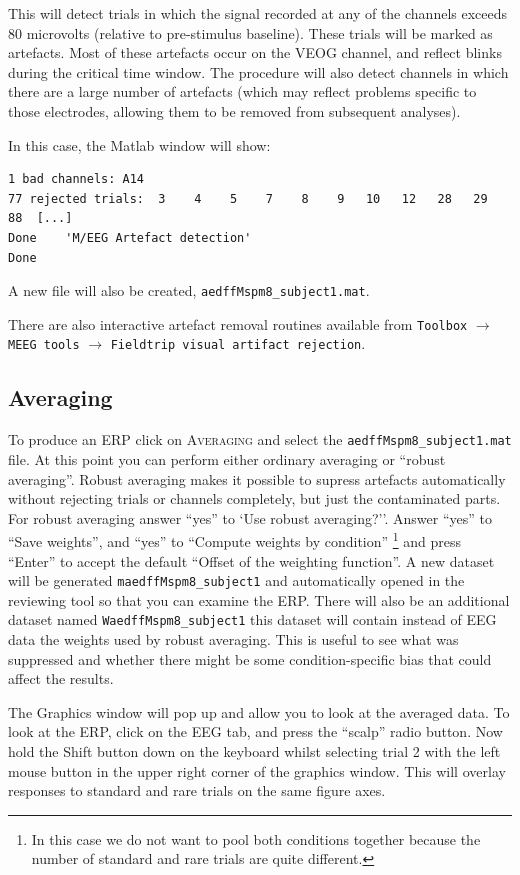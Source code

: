 This will detect trials in which the signal recorded at any of the channels exceeds 80 microvolts (relative to pre-stimulus baseline). These trials will be marked as artefacts. Most of these artefacts occur on the VEOG channel, and reflect blinks during the critical time window. The procedure will also detect channels in which there are a large number of artefacts (which may reflect problems specific to those electrodes, allowing them to be removed from subsequent analyses).

In this case, the Matlab window will show:
\begin{verbatim}
1 bad channels: A14 
77 rejected trials:  3    4    5    7    8    9   10   12   28   29   88  [...]
Done    'M/EEG Artefact detection'
Done
\end{verbatim}
A new file will also be created, \texttt{aedffMspm8\_subject1.mat}.

There are also interactive artefact removal routines available from \texttt{Toolbox} $\rightarrow$ \texttt{MEEG tools} $\rightarrow$  \texttt{Fieldtrip visual artifact rejection}.

\subsection{Averaging}
To produce an ERP click on \textsc{Averaging} and select the \texttt{aedffMspm8\_subject1.mat} file. At this point you can perform either ordinary averaging or ``robust averaging''. Robust averaging makes it possible to supress artefacts automatically without rejecting trials or channels completely, but just the contaminated parts. For robust averaging answer ``yes'' to `Use robust averaging?''. Answer ``yes'' to ``Save weights'', and ``yes'' to ``Compute weights by condition'' \footnote{In this case we do not want to pool both conditions together because the number of standard and rare trials are quite different.} and press ``Enter'' to accept the default ``Offset of the weighting function''. A new dataset will be generated \texttt{maedffMspm8\_subject1}  and automatically opened in the reviewing tool so that you can examine the ERP. There will also be an additional dataset named \texttt{WaedffMspm8\_subject1} this dataset will contain instead of EEG data the weights used by robust averaging. This is useful to see what was suppressed and whether there might be some condition-specific bias that could affect the results.

The Graphics window will pop up and allow you to look at the averaged data. To look at the ERP, click on the EEG tab, and press the ``scalp'' radio button. Now hold  the Shift button down on the keyboard whilst selecting trial 2 with the left mouse button in the upper right corner of the graphics window. This will overlay responses to standard and rare trials on the same figure axes.

